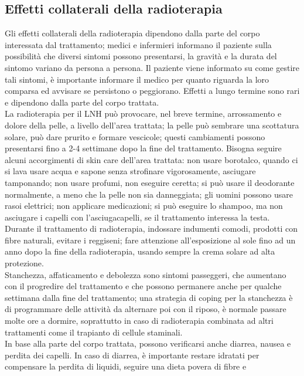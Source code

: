 \subsection{Effetti collaterali della radioterapia}
Gli effetti collaterali della radioterapia dipendono dalla parte del corpo interessata dal trattamento; 
medici e infermieri informano il paziente sulla possibilità che diversi sintomi possono presentarsi, la gravità e 
la durata del sintomo variano da persona a persona. 
Il paziente viene informato su come gestire tali sintomi, è importante informare il medico per quanto riguarda la 
loro comparsa ed avvisare se persistono o peggiorano. Effetti a lungo termine sono rari e dipendono dalla parte 
del corpo trattata\cite{MACMILLAN}.\\
La radioterapia per il LNH può provocare, nel breve termine, arrossamento e dolore della pelle, a livello dell’area 
trattata; la pelle può sembrare una scottatura solare, può dare prurito e formare vescicole; questi cambiamenti possono
presentarsi fino a 2-4 settimane dopo la fine del trattamento. Bisogna seguire alcuni accorgimenti di skin care 
dell’area trattata: non usare borotalco, quando ci si lava usare acqua e sapone senza strofinare vigorosamente, 
asciugare tamponando; non usare profumi, non eseguire ceretta; si può usare il deodorante normalmente, a meno che 
la pelle non sia danneggiata; gli uomini possono usare rasoi elettrici; non applicare medicazioni; si può eseguire 
lo shampoo, ma non asciugare i capelli con l’asciugacapelli, se il trattamento interessa la testa.\\ 
Durante il trattamento di radioterapia, indossare indumenti comodi, prodotti con fibre naturali, evitare i reggiseni; 
fare attenzione all’esposizione al sole fino ad un anno dopo la fine della radioterapia, usando sempre la crema 
solare ad alta protezione\cite{UKRADIOTP}.\\
Stanchezza, affaticamento e debolezza sono sintomi passeggeri, che aumentano con il progredire del trattamento e che 
possono permanere anche per qualche settimana dalla fine del trattamento; una strategia di coping per la stanchezza è 
di programmare delle attività da alternare poi con il riposo, è normale passare molte ore a dormire, soprattutto in 
caso di radioterapia combinata ad altri trattamenti come il trapianto di cellule staminali.\\ 
In base alla parte del corpo trattata, possono verificarsi anche diarrea, nausea e perdita dei capelli. In caso di 
diarrea, è importante restare idratati per compensare la perdita di liquidi, seguire una dieta povera di fibre e 
